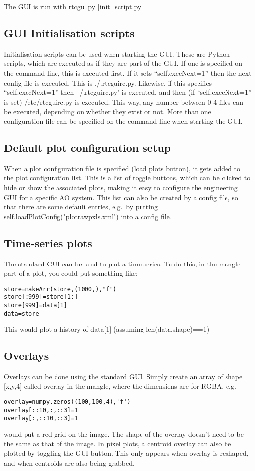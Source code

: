 \documentclass[a4,10pt]{article}
\begin{document}
The GUI is run with rtcgui.py [init\_script.py]

\subsection{GUI Initialisation scripts}
Initialisation scripts can be used when starting the GUI.  These are
Python scripts, which are executed as if they are part of the GUI.  If
one is specified on the command line, this is executed first.  If it
sets ``self.execNext=1'' then the next config file is executed.  This
is ./.rtcguirc.py.  Likewise, if this specifies ``self.execNext=1''
then ~/.rtcguirc.py' is executed, and then (if ``self.execNext=1'' is
set) /etc/rtcguirc.py is executed.  This way, any number between 0-4
files can be executed, depending on whether they exist or not.  More
than one configuration file can be specified on the command line when
starting the GUI.

\subsection{Default plot configuration setup}
When a plot configuration file is specified (load plots button), it
gets added to the plot configuration list.  This is a list of toggle
buttons, which can be clicked to hide or show the associated plots,
making it easy to configure the engineering GUI for a specific AO system.
This list can also be created by a config file, so that there are some
default entries, e.g.\ by putting
self.loadPlotConfig("plotrawpxls.xml") into a config file.

\subsection{Time-series plots}
The standard GUI can be used to plot a time series.
To do this, in the mangle part of a plot, you could put something
like:
\begin{verbatim}
store=makeArr(store,(1000,),"f")
store[:999]=store[1:]
store[999]=data[1]
data=store
\end{verbatim}
This would plot a history of data[1] (assuming len(data.shape)==1)

\subsection{Overlays}
Overlays can be done using the standard GUI.
Simply create an array of shape [x,y,4] called overlay in the mangle,
where the dimensions are for RGBA.  
e.g.
\begin{verbatim}
overlay=numpy.zeros((100,100,4),'f')
overlay[::10,:,::3]=1
overlay[:,::10,::3]=1
\end{verbatim}
would put a red grid on the image.  The shape of the overlay doesn't
need to be the same as that of the image.
In pixel plots, a centroid overlay can also be plotted by toggling the
GUI button.  This only appears when overlay is reshaped, and when
centroids are also being grabbed.
\end{document}
